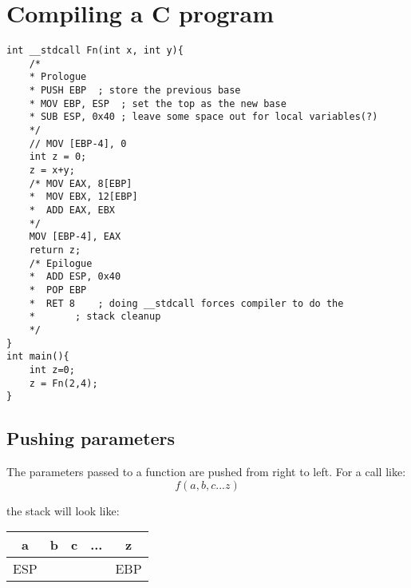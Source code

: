 \documentclass[11pt,letterpaper]{article}
\begin{document}
\section*{Compiling a C program}

\begin{verbatim}
int __stdcall Fn(int x, int y){
	/*
	* Prologue
	* PUSH EBP	; store the previous base
	* MOV EBP, ESP	; set the top as the new base
	* SUB ESP, 0x40 ; leave some space out for local variables(?)
	*/
	// MOV [EBP-4], 0
	int z = 0;
	z = x+y;
	/* MOV EAX, 8[EBP]
	*  MOV EBX, 12[EBP]
	*  ADD EAX, EBX
	*/
	MOV [EBP-4], EAX
	return z;
	/* Epilogue
	*  ADD ESP, 0x40
	*  POP EBP
	*  RET 8	; doing __stdcall forces compiler to do the 
	*		; stack cleanup
	*/
}
int main(){
	int z=0;
	z = Fn(2,4);
}
\end{verbatim}


\subsection*{Pushing parameters}
The parameters passed to a function are pushed from right to left. For a call like:
\[f(a, b, c ... z)\]

the stack will look like:
\newline
\begin{center}
\begin{tabular}{|c|c|c|c|c|}
	\hline a & b & c & ... & z\\
	\hline ESP & & & & EBP \\
	\hline
\end{tabular}
\end{center}
\end{document}
